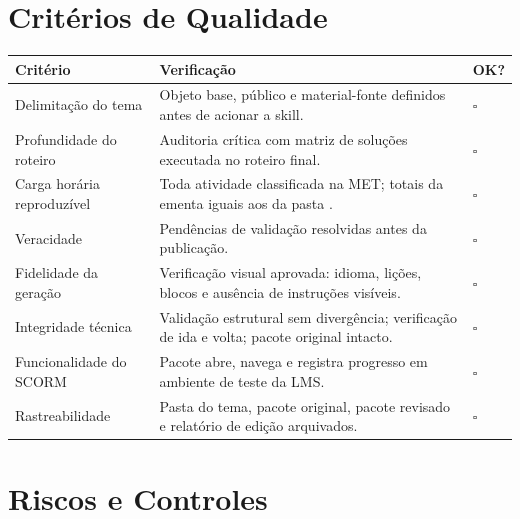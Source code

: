 \documentclass[12pt,a4paper]{article}
\begin{document}
\section{Critérios de Qualidade}

\begingroup\small
\renewcommand{\arraystretch}{1.3}
\begin{longtable}{@{}L{0.26\textwidth}L{0.60\textwidth}C{0.08\textwidth}@{}}
\toprule
\textbf{Critério} & \textbf{Verificação} & \textbf{OK?} \\
\midrule
\endhead
\bottomrule
\endlastfoot
Delimitação do tema & Objeto base, público e material-fonte definidos antes de acionar a skill. & $\square$ \\
Profundidade do roteiro & Auditoria crítica com matriz de soluções executada no roteiro final. & $\square$ \\
Carga horária reproduzível & Toda atividade classificada na MET; totais da ementa iguais aos da pasta . & $\square$ \\
Veracidade & Pendências de validação resolvidas antes da publicação. & $\square$ \\
Fidelidade da geração & Verificação visual aprovada: idioma, lições, blocos e ausência de instruções visíveis. & $\square$ \\
Integridade técnica & Validação estrutural sem divergência; verificação de ida e volta; pacote original intacto. & $\square$ \\
Funcionalidade do SCORM & Pacote abre, navega e registra progresso em ambiente de teste da LMS. & $\square$ \\
Rastreabilidade & Pasta do tema, pacote original, pacote revisado e relatório de edição arquivados. & $\square$ \\
\end{longtable}
\endgroup

\section{Riscos e Controles}
\end{document}
